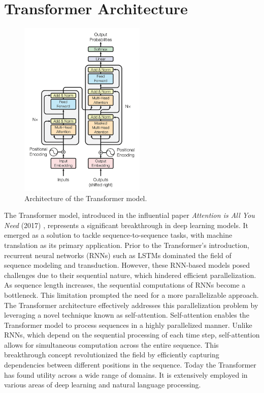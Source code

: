 \documentclass[12pt,oneside,bibtotoc,liststotoc]{scrbook}
\begin{document}
\section{Transformer Architecture}
\begin{figure}
  \centering
  \includegraphics[width=6cm]{img/transformer.png}
  \caption{Architecture of the Transformer model. \cite{VaswaniAttentionIsAll}}
  \label{fig:transformer}
\end{figure}
The Transformer model, introduced in the influential paper \textit{Attention is All You Need} (2017) \cite{VaswaniAttentionIsAll}, represents a significant breakthrough in deep learning models. It emerged as a solution to tackle sequence-to-sequence tasks, with machine translation as its primary application. Prior to the Transformer's introduction, recurrent neural networks (RNNs) such as LSTMs dominated the field of sequence modeling and transduction. However, these RNN-based models posed challenges due to their sequential nature, which hindered efficient parallelization. As sequence length increases, the sequential computations of RNNs become a bottleneck. This limitation prompted the need for a more parallelizable approach. The Transformer architecture effectively addresses this parallelization problem by leveraging a novel technique known as self-attention. Self-attention enables the Transformer model to process sequences in a highly parallelized manner. Unlike RNNs, which depend on the sequential processing of each time step, self-attention allows for simultaneous computation across the entire sequence. This breakthrough concept revolutionized the field by efficiently capturing dependencies between different positions in the sequence. \cite{VaswaniAttentionIsAll} Today the Transformer has found utility across a wide range of domains. It is extensively employed in various areas of deep learning and natural language processing. \cite{LinSurvey}
\end{document}

